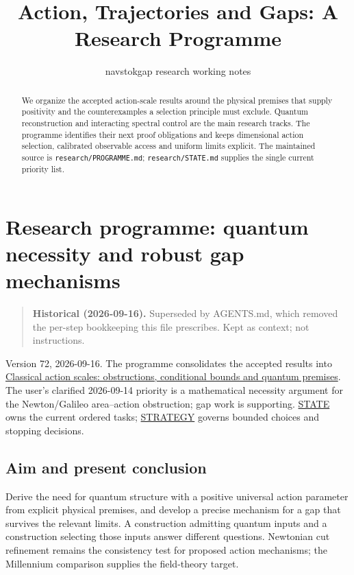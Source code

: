\documentclass[11pt,a4paper]{article}
\title{Action, Trajectories and Gaps: A Research Programme}
\author{navstokgap research working notes}
\date{}
\begin{document}
\maketitle
\begin{abstract}
We organize the accepted action-scale results around the physical premises
that supply positivity and the counterexamples a selection principle must
exclude. Quantum reconstruction and interacting spectral control are the main
research tracks. The programme identifies their next proof obligations and
keeps dimensional action selection, calibrated observable access and uniform
limits explicit. The maintained source is \texttt{research/PROGRAMME.md};
\texttt{research/STATE.md} supplies the single current priority list.
\end{abstract}
\hypertarget{research-programme-quantum-necessity-and-robust-gap-mechanisms}{%
\section{Research programme: quantum necessity and robust gap
mechanisms}\label{research-programme-quantum-necessity-and-robust-gap-mechanisms}}

\begin{quote}
\textbf{Historical (2026-09-16).} Superseded by AGENTS.md, which removed
the per-step bookkeeping this file prescribes. Kept as context; not
instructions.
\end{quote}

Version 72, 2026-09-16. The programme consolidates the accepted results
into \href{../notes/action-unit-dimensional-selection.md#observables-and-the-admissible-class}{Classical action
scales: obstructions, conditional bounds and quantum premises}. The
user's clarified 2026-09-14 priority is a mathematical necessity
argument for the Newton/Galileo area--action obstruction; gap work is
supporting. \href{STATE.md}{STATE} owns the current ordered tasks;
\href{STRATEGY.md}{STRATEGY} governs bounded choices and stopping
decisions.

\hypertarget{aim-and-present-conclusion}{%
\subsection{Aim and present
conclusion}\label{aim-and-present-conclusion}}

Derive the need for quantum structure with a positive universal action
parameter from explicit physical premises, and develop a precise
mechanism for a gap that survives the relevant limits. A construction
admitting quantum inputs and a construction selecting those inputs
answer different questions. Newtonian cut refinement remains the
consistency test for proposed action mechanisms; the Millennium
comparison supplies the field-theory target.
\end{document}
